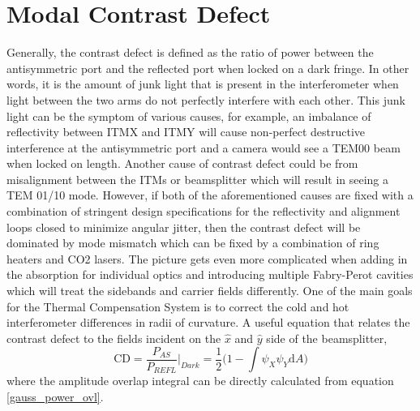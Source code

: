 	\section{Modal Contrast Defect}
	Generally, the contrast defect is defined as the ratio of power between the antisymmetric port and the reflected port when locked on a dark fringe.  In other words, it is the amount of junk light that is present in the interferometer when light between the two arms do not perfectly interfere with each other. This junk light can be the symptom of various causes, for example, an imbalance of reflectivity between ITMX and ITMY will cause non-perfect destructive interference at the antisymmetric port and a camera would see a TEM00 beam when locked on length.  Another cause of contrast defect could be from misalignment between the ITMs or beamsplitter which will result in seeing a TEM 01/10 mode.  However, if both of the aforementioned causes are fixed with a combination of stringent design specifications for the reflectivity and alignment loops closed to minimize angular jitter, then the contrast defect will be dominated by mode mismatch which can be fixed by a combination of ring heaters and CO2 lasers.  The picture gets even more complicated when adding in the absorption for individual optics and introducing multiple Fabry-Perot cavities which will treat the sidebands and carrier fields differently.  One of the main goals for the Thermal Compensation System is to correct the cold and hot interferometer differences in radii of curvature.  A useful equation that relates the contrast defect to the fields incident on the $\hat{x}$ and $\hat{y}$ side of the beamsplitter,
	\begin{equation}\label{CD}
	\text{CD} = \frac{P_{AS}}{P_{REFL}} \bigg\vert_{Dark} = \frac{1}{2} \bigg( 1 - \int \psi_X \psi_Y \text{d}A\bigg)
	\end{equation}
	where the amplitude overlap integral can be directly calculated from equation \ref{gauss_power_ovl}. 
	
